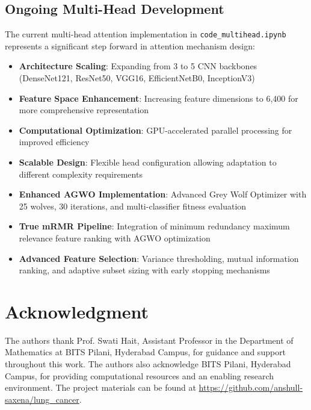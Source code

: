 \documentclass[journal]{IEEEtran}
\begin{document}
\subsection{Ongoing Multi-Head Development}

The current multi-head attention implementation in \texttt{code\_multihead.ipynb} represents a significant step forward in attention mechanism design:

\begin{itemize}
    \item \textbf{Architecture Scaling}: Expanding from 3 to 5 CNN backbones (DenseNet121, ResNet50, VGG16, EfficientNetB0, InceptionV3)
    \item \textbf{Feature Space Enhancement}: Increasing feature dimensions to 6,400 for more comprehensive representation
    \item \textbf{Computational Optimization}: GPU-accelerated parallel processing for improved efficiency
    \item \textbf{Scalable Design}: Flexible head configuration allowing adaptation to different complexity requirements
    \item \textbf{Enhanced AGWO Implementation}: Advanced Grey Wolf Optimizer with 25 wolves, 30 iterations, and multi-classifier fitness evaluation
    \item \textbf{True mRMR Pipeline}: Integration of minimum redundancy maximum relevance feature ranking with AGWO optimization
    \item \textbf{Advanced Feature Selection}: Variance thresholding, mutual information ranking, and adaptive subset sizing with early stopping mechanisms
\end{itemize}

\section*{Acknowledgment}

The authors thank Prof. Swati Hait, Assistant Professor in the Department of Mathematics at BITS Pilani, Hyderabad Campus, for guidance and support throughout this work. The authors also acknowledge BITS Pilani, Hyderabad Campus, for providing computational resources and an enabling research environment. The project materials can be found at \url{https://github.com/anshull-saxena/lung_cancer}.
\end{document}
